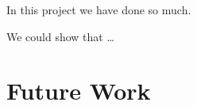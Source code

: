 \label{chap:7_conclusion}
In this project we have done so much.

We could show that \ldots \\

\section{Future Work}